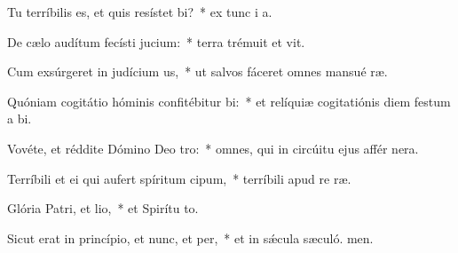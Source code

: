 \item Tu terríbilis es, et quis resístet bi?~* ex tunc i a.
\item De cælo audítum fecísti jucium:~* terra trémuit et vit.
\item Cum exsúrgeret in judícium us,~* ut salvos fáceret omnes mansué ræ.
\item Quóniam cogitátio hóminis confitébitur bi:~* et relíquiæ cogitatiónis diem festum a bi.
\item Vovéte, et réddite Dómino Deo tro:~* omnes, qui in circúitu ejus affér nera.
\item Terríbili et ei qui aufert spíritum cipum,~* terríbili apud re ræ.
\item Glória Patri, et lio,~* et Spirítu to.
\item Sicut erat in princípio, et nunc, et per,~* et in sǽcula sæculó. men.
